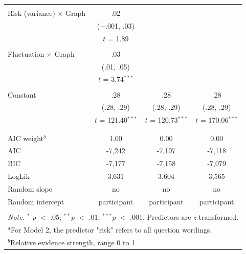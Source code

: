 \begin{table}[!htbp]
\begin{tabular}{@{\extracolsep{5pt}}lccc}
 & & & \\ 
 Risk (variance) $\times$ Graph & .02 & & \\ 
 & ($-$.001, .03) & & \\ 
 & $t$ = 1.89 & & \\ 
 & & & \\ 
 Fluctuation $\times$ Graph & .03 & & \\ 
 & (.01, .05) & & \\ 
 & $t$ = 3.74$^{***}$ & & \\ 
 & & & \\ \midrule
 Constant & .28 & .28 & .28 \\ 
 & (.28, .29) & (.28, .29) & (.28, .29) \\ 
 & $t$ = 121.40$^{***}$ & $t$ = 120.73$^{***}$ & $t$ = 170.06$^{***}$ \\ 
 & & & \\ 
\hline \\[-1.8ex] 
AIC weight$^{b}$ & 1.00 & 0.00 & 0.00 \\ 
AIC & -7,242 & -7,197 & -7,118 \\ 
BIC & -7,177 & -7,158 & -7,079 \\ 
LogLik & 3,631 & 3,604 & 3,565 \\ 
Random slope & no & no & no \\ 
Random intercept & participant & participant & participant \\ 
\hline 
\hline \\[-1.8ex] 
\multicolumn{4}{l}{\textit{Note.} $^{*}$ \textit{p} $<$ .05; $^{**}$\textit{p} $<$ .01; $^{***}$\textit{p} $<$ .001. Predictors are \textit{z} transformed.} \\
  \multicolumn{4}{l}{$^{a}$For Model 2, the predictor "risk" refers to all question wordings.} \\ 
 \multicolumn{4}{l}{$^{b}$Relative evidence strength, range 0 to 1 {\citep{Wagenmakers2004}}} \\
\end{tabular} 
\end{table} 




